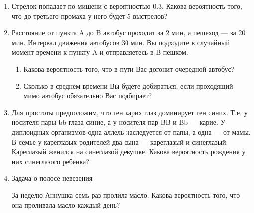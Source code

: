 \documentclass[nobib]{tufte-handout}
\theoremstyle{definition}
\begin{document}
\begin{enumerate}
\item Стрелок попадает по мишени с вероятностью 0.3. Какова вероятность того, что до третьего промаха у него будет 5 выстрелов?

\item Расстояние от пункта A до B автобус проходит за 2 мин, а пешеход — за 20 мин. Интервал движения автобусов 30 мин. Вы подходите в случайный момент времени к пункту A и отправляетесь в B пешком.

\begin{enumerate}
\item Какова вероятность того, что в пути Вас догонит очередной автобус?
\item Сколько в среднем времени Вы будете добираться, если проходящий мимо автобус обязательно Вас подбирает?
\end{enumerate}



\item Для простоты предположим, что ген карих глаз доминирует ген синих. Т.е. у носителя пары bb глаза синие, а у носителя пар BB и Bb — карие. У диплоидных
организмов  одна аллель наследуется от папы, а одна — от мамы. В семье у кареглазых родителей два сына — кареглазый и
синеглазый. Кареглазый женился на синеглазой девушке. Какова
вероятность рождения у них синеглазого ребенка?


\item Задача о полосе невезения

За неделю Аннушка семь раз пролила масло. Какова вероятность того, что она проливала масло каждый день?



\end{enumerate}

\end{document}
